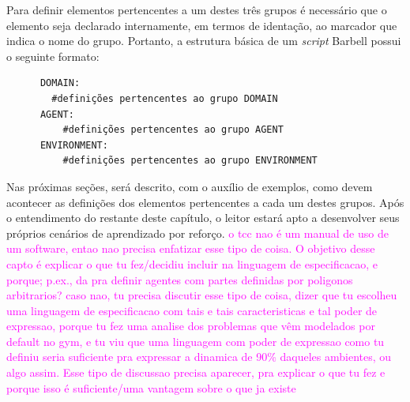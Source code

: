 \documentclass[cic,tc]{iiufrgs}
\newcommand\bruno[1]{\textcolor{magenta}{#1}}
\begin{document}
    Para definir elementos pertencentes a um destes três grupos é necessário que o elemento seja declarado internamente,
    em termos de identação, ao marcador que indica o nome do grupo. Portanto, a estrutura básica de um \textit{script} Barbell possui o seguinte formato:
    
      \begin{verbatim}
      DOMAIN:
        #definições pertencentes ao grupo DOMAIN
      AGENT:
          #definições pertencentes ao grupo AGENT
      ENVIRONMENT:
          #definições pertencentes ao grupo ENVIRONMENT
      \end{verbatim}
    
    Nas próximas seções, será descrito, com o auxílio de exemplos, como devem acontecer as definições dos elementos pertencentes a cada um destes grupos. Após o entendimento
    do restante deste capítulo, o leitor estará apto a desenvolver seus próprios cenários de aprendizado por reforço. \bruno{o tcc nao é um manual de uso de um software, entao nao precisa enfatizar esse tipo de coisa. O objetivo desse capto é explicar o que tu fez/decidiu incluir na linguagem de especificacao, e porque; p.ex., da pra definir agentes com partes definidas por poligonos arbitrarios? caso nao, tu precisa discutir esse tipo de coisa, dizer que tu escolheu uma linguagem de especificacao com tais e tais caracteristicas e tal poder de expressao, porque tu fez uma analise dos problemas que vêm modelados por default no gym, e tu viu que uma linguagem com poder de expressao como tu definiu seria suficiente pra expressar a dinamica de 90\% daqueles ambientes, ou algo assim. Esse tipo de discussao precisa aparecer, pra explicar o que tu fez e porque isso é suficiente/uma vantagem sobre o que ja existe}
    
\end{document}
